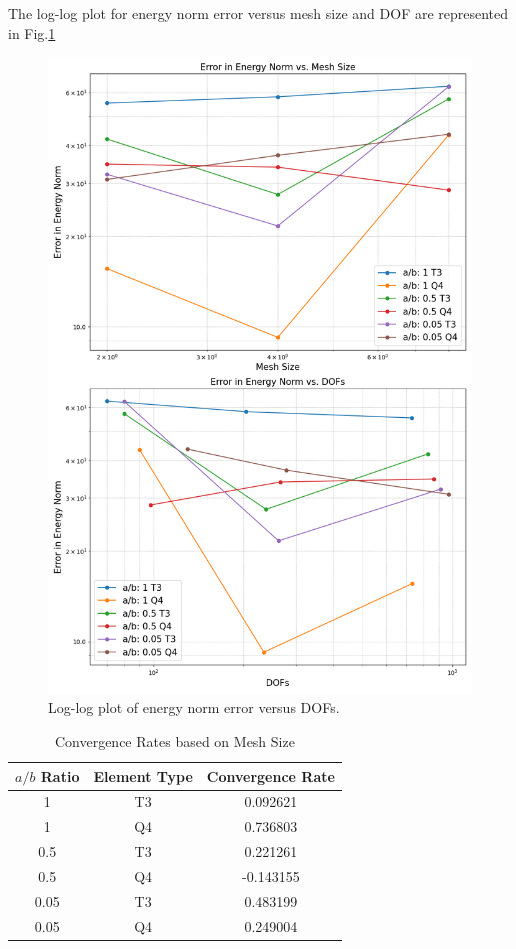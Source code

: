 \documentclass[twoside,twocolumn,10pt]{article}
\begin{document}
The log-log plot for energy norm error versus mesh size and DOF are represented in Fig.\ref{fig:logDOF_Q2_4} 
\begin{figure}[!ht]
  \centering
  \includegraphics[width=1.\linewidth]{Q2_4/log_DOFs.png}
  \caption{Log-log plot of energy norm error versus DOFs.}
  \label{fig:logDOF_Q2_4}
\end{figure}
\begin{table}[h]
  \centering
  \caption{Convergence Rates based on Mesh Size}
  \begin{tabular}{|c|c|c|}
  \hline
  \(a/b\) Ratio & Element Type & Convergence Rate \\
  \hline
  1 & T3 & 0.092621 \\
  1 & Q4 & 0.736803 \\
  0.5 & T3 & 0.221261 \\
  0.5 & Q4 & -0.143155 \\
  0.05 & T3 & 0.483199 \\
  0.05 & Q4 & 0.249004 \\
  \hline
  \end{tabular}
  \label{tab:convergenceRate_Meshsize}
\end{table}
\end{document}
